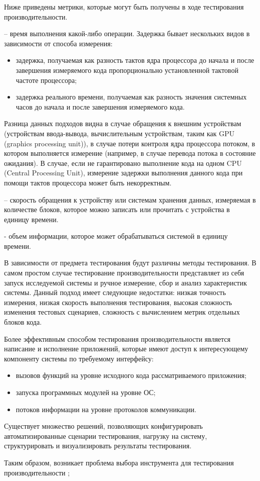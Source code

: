 Ниже приведены метрики, которые могут быть получены в ходе тестирования производительности.
\begin{description}[noitemsep]
	\item [Задержка] -- время выполнения какой-либо операции. Задержка бывает нескольких видов в зависимости от способа измерения:
	\begin{itemize}[noitemsep]
		\item задержка, получаемая как разность тактов ядра процессора до начала и после завершения измеряемого кода пропорционально установленной тактовой частоте процессора;
		\item задержка реального времени, получаемая как разность значения системных часов до начала и после завершения измеряемого кода.
	\end{itemize}
	Разница данных подходов видна в случае обращения к внешним устройствам (устройствам ввода-вывода, вычислительным устройствам, таким как GPU (graphics processing unit)), в случае потери контроля ядра процессора потоком, в котором выполняется измерение (например, в случае перевода потока в состояние ожидания). В случае, если не гарантировано выполнение кода на одном CPU (Central Processing Unit), измерение задержки выполнения данного кода при помощи тактов процессора может быть некорректным.
	\item [IOPS (Input/Output Per Second)] -- скорость обращения к устройству или системам хранения данных, измеряемая в количестве блоков, которое можно записать или прочитать с устройства в единицу времени. 
	\item [Широта пропускания] - объем информации, которое может обрабатываться системой в единицу времени.
\end{description}

В зависимости от предмета тестирования будут различны методы тестирования. В самом простом случае тестирование производительности представляет из себя запуск исследуемой системы и ручное измерение, сбор и анализ характеристик системы. Данный подход имеет следующие недостатки: низкая точность измерения, низкая скорость выполнения тестирования, высокая сложность изменения тестовых сценариев, сложность с вычислением метрик отдельных блоков кода.

Более эффективным способом тестирования производительности является написание и исполнение приложений, которые имеют доступ к интересующему компоненту системы по требуемому интерфейсу:
\begin{itemize}[noitemsep]
	\item вызовов функций на уровне исходного кода рассматриваемого приложения;
	\item запуска программных модулей на уровне ОС;
	\item потоков информации на уровне протоколов коммуникации.
\end{itemize}

Существует множество решений, позволяющих конфигурировать автоматизированные сценарии тестирования, нагрузку на систему, структурировать и визуализировать результаты тестирования.

Таким образом, возникает проблема выбора инструмента для тестирования производительности \marm{};